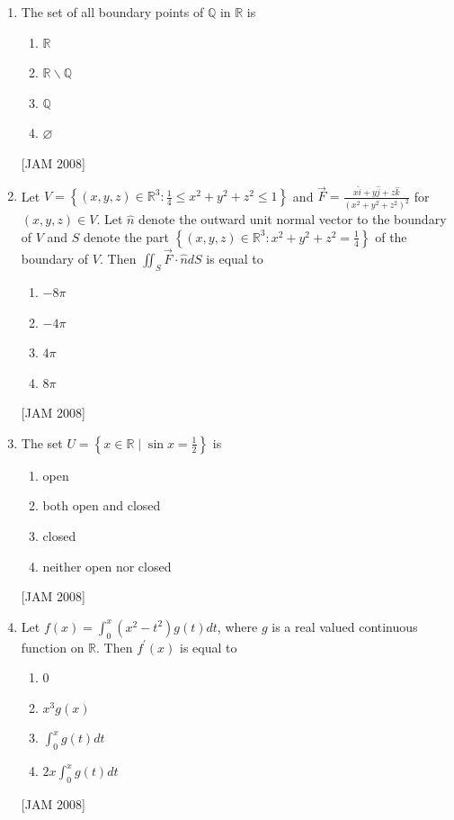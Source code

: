\begin{enumerate}
\item  The set of all boundary points of $\mathbb{Q}$ in $\mathbb{R}$ is 
\begin{enumerate}
\item $\mathbb{R}$ 
\item $\mathbb{R} \backslash \mathbb{Q}$ 
\item $\mathbb{Q}$ 
\item $\varnothing$
\end{enumerate}
 \hfill [JAM 2008]


\item  Let $V=\left\{(x, y, z) \in \mathbb{R}^{3}: \frac{1}{4} \leq x^{2}+y^{2}+z^{2} \leq 1\right\}$ and $\vec{F}=\frac{x \hat{i}+y \hat{j}+z \hat{k}}{\left(x^{2}+y^{2}+z^{2}\right)^{2}}$ for $(x, y, z) \in V$. Let $\hat{n}$ denote the outward unit normal vector to the boundary of $V$ and $S$ denote the part $\left\{(x, y, z) \in \mathbb{R}^{3}: x^{2}+y^{2}+z^{2}=\frac{1}{4}\right\}$ of the boundary of $V$. Then $\iint_{S} \vec{F} \cdot \hat{n} d S$ is equal to 
\begin{enumerate}
\item $-8 \pi$ 
\item $-4 \pi$ 
\item $4 \pi$ 
\item $8 \pi$
\end{enumerate}
 \hfill [JAM 2008]


\item  The set $U=\left\{x \in \mathbb{R} \mid \sin x=\frac{1}{2}\right\}$ is 
\begin{enumerate}
\item open 
\item both open and closed 
\item closed 
\item neither open nor closed
\end{enumerate}
 \hfill [JAM 2008]


\item  Let $f(x)=\int_{0}^{x}\left(x^{2}-t^{2}\right) g(t) d t$, where $g$ is a real valued continuous function on $\mathbb{R}$. Then $f^{\prime}(x)$ is equal to 
\begin{enumerate}
\item 0 
\item $x^{3} g(x)$ 
\item $\int_{0}^{x} g(t) d t$ 
\item $2 x \int_{0}^{x} g(t) d t$
\end{enumerate}
 \hfill [JAM 2008]





\end{enumerate}
